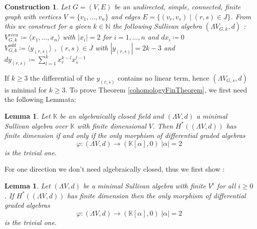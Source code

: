 \documentclass[12pt,a4paper]{scrartcl}
\newtheorem{Lemma}[Theorem]{Lemma}
\newtheorem{Construction}[Theorem]{Construction}
\numberwithin{equation}{section}
\newcommand{\K}{\mathbb{K}} %
\newcommand{\N}{\mathbb{N}} %
\newcommand{\Sullivan}{(\Lambda V,d)}
\begin{document}
 \begin{Construction}
 \label{constructionOfSullivanAlgebra}
 Let $G = (V,E)$ be an undirected, simple, connected, finite graph with vertices $ V = \lbrace v_1, \dotsc , v_n \rbrace $
 and edges $ E = \lbrace (v_r, v_s) \; | \; (r,s) \in J \rbrace$. From this we construct for a given $k \in \N$ the following
 Sullivan algebra $(\Lambda V_{G,k} , d)$ : \\
 
 $ V^{even}_{G,k} \coloneqq \langle x_1, \dotsc , x_n \rangle $ \; with \; $|x_i| = 2$ \; for \; $ i = 1, \dotsc , n$ \; 
 and \; $dx_i \coloneqq 0$ \\
 
 $V^{odd}_{G,k} \coloneqq \langle y_{(r,s)} \rangle$ , $(r,s) \in J$ \; with \; $|y_{(r,s)}| = 2k - 3$ \; and \; $dy_{(r,s)} \coloneqq 
 \sum_{l = 1}^k x_r^{k -l} x_s^{l - 1}$ \\
 
 \end{Construction}

  If $k \geq 3$ the differential of the $y_{(r,s)}$ contains no linear term, hence
  $(\Lambda V_{G,s} ,d)$ is minimal for $k \geq 3$. To prove Theorem \ref{cohomologyFinTheorem}, we first need the following Lemmata:
 
 \begin{Lemma}
  Let $\K$ be an algebraically closed field and $(\Lambda V,d)$ a minimal Sullivan
  algebra over $\K$ with finite dimensional $V$. 
  Then $H^*(\Sullivan)$ has finite dimension if and only if   
  the only morphism of differential graded algebras 
  $$ \varphi : \Sullivan \to (\K[\alpha],0) \; |\alpha| = 2 $$ 
  is the trivial one.
 \end{Lemma}
 For one direction we don't need algebraically closed, thus we first show :
  \begin{Lemma}
   Let $(\Lambda V,d)$ be a minimal Sullivan algebra with finite $V^i$ for all $i \geq 0$. \newline
  If $H^*(\Sullivan)$ has finite dimension then
  the only morphism of differential graded algebras 
  $$ \varphi : \Sullivan \to (\K[\alpha],0) \; |\alpha| = 2 $$ 
  is the trivial one.
  \end{Lemma}
\end{document}
